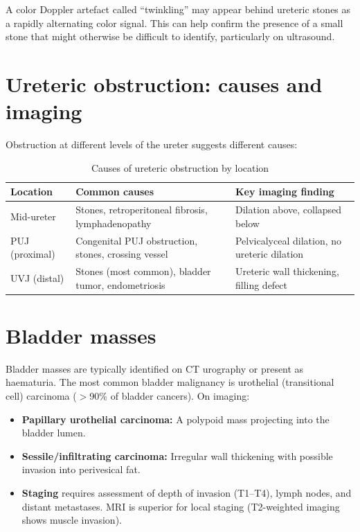 \begin{pearlbox}
A color Doppler artefact called ``twinkling'' may appear behind ureteric stones as a rapidly alternating color signal. This can help confirm the presence of a small stone that might otherwise be difficult to identify, particularly on ultrasound.
\end{pearlbox}

\section{Ureteric obstruction: causes and imaging}
Obstruction at different levels of the ureter suggests different causes:

\begin{table}[h]
\centering
\caption{Causes of ureteric obstruction by location}
\label{tab:obstruction_causes}
\begin{tabular}{@{}p{}p{}p{}@{}}
\hline
\textbf{Location} & \textbf{Common causes} & \textbf{Key imaging finding} \\
\hline
Mid-ureter & Stones, retroperitoneal fibrosis, lymphadenopathy & Dilation above, collapsed below \\
PUJ (proximal) & Congenital PUJ obstruction, stones, crossing vessel & Pelvicalyceal dilation, no ureteric dilation \\
UVJ (distal) & Stones (most common), bladder tumor, endometriosis & Ureteric wall thickening, filling defect \\
\hline
\end{tabular}
\end{table}

\section{Bladder masses}
Bladder masses are typically identified on CT urography or present as haematuria. The most common bladder malignancy is urothelial (transitional cell) carcinoma ($>$90\% of bladder cancers). On imaging:
\begin{itemize}
    \item \textbf{Papillary urothelial carcinoma:} A polypoid mass projecting into the bladder lumen.
    \item \textbf{Sessile/infiltrating carcinoma:} Irregular wall thickening with possible invasion into perivesical fat.
    \item \textbf{Staging} requires assessment of depth of invasion (T1--T4), lymph nodes, and distant metastases. MRI is superior for local staging (T2-weighted imaging shows muscle invasion).
\end{itemize}

